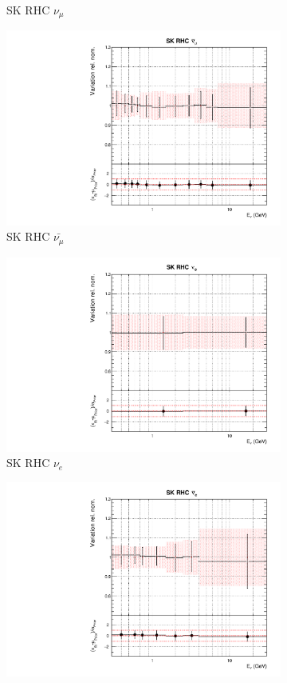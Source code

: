 \begin{figure}
\begin{subfigure}{0.24\textwidth}
  \caption{SK RHC $\nu_{\mu}$}
\end{subfigure}
\begin{subfigure}{0.24\textwidth}
  \centering
  \includegraphics[width=0.95\linewidth]{figs/asmvflux13}
  \caption{SK RHC $\bar{\nu_{\mu}}$}
\end{subfigure}
\begin{subfigure}{0.24\textwidth}
  \centering
  \includegraphics[width=0.95\linewidth]{figs/asmvflux14}
  \caption{SK RHC $\nu_{e}$}
\end{subfigure}
\begin{subfigure}{0.24\textwidth}
  \centering
  \includegraphics[width=0.95\linewidth]{figs/asmvflux15}

\end{subfigure}
\end{figure}
